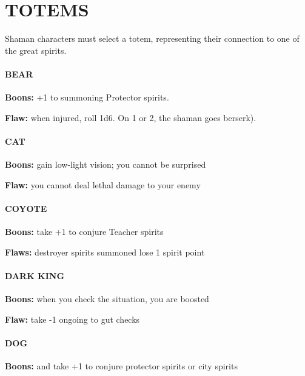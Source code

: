 \documentclass[oneside,10pt]{article}
\begin{document}
\section{TOTEMS}
\begin{multicols}{2}
Shaman characters must select a totem, representing their
connection to one of the great spirits.

\paragraph{BEAR}
\begin{adjustwidth*}{.5cm}{.5cm}
\textbf{Boons:} +1 to summoning Protector spirits.

\textbf{Flaw:} when injured, roll 1d6. On 1 or 2, the shaman goes
berserk).
\end{adjustwidth*}
\paragraph{CAT}
\begin{adjustwidth*}{.5cm}{.5cm}
\textbf{Boons:} gain low-light vision; you cannot be surprised

\textbf{Flaw:} you cannot deal lethal damage to your enemy
\end{adjustwidth*}


\paragraph{COYOTE}
\begin{adjustwidth*}{.5cm}{.5cm}
\textbf{Boons:} take +1 to conjure Teacher spirits

\textbf{Flaws:} destroyer spirits summoned lose 1 spirit point
\end{adjustwidth*}

\paragraph{DARK KING}
\begin{adjustwidth*}{.5cm}{.5cm}
\textbf{Boons:} when you check the situation, you are boosted

\textbf{Flaw:} take -1 ongoing to gut checks
\end{adjustwidth*}

\paragraph{DOG}
\begin{adjustwidth*}{.5cm}{.5cm}
\textbf{Boons:} and take +1 to conjure protector spirits or city
spirits


\end{adjustwidth*}
\end{multicols}
\end{document}
